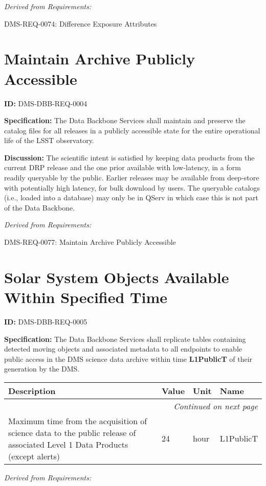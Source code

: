 \documentclass[SE,toc,lsstdraft]{lsstdoc}
\makeatletter
\newcommand{\paramname}[1]{\hspace{0pt}#1}
\newcommand{\unitname}[1]{\hspace{0pt}#1}
\newenvironment{parameters}[0]{%
\setlength\LTleft{0pt}
\setlength\LTright{\fill}
\begin{small}
\begin{longtable}[]{|p{0.49\textwidth}|l|p{0.6in}|p{1.70in}@{}|}

\hline \textbf{Description} & \textbf{Value} & \textbf{Unit} & \textbf{Name} \\ \hline
\endhead

\hline \multicolumn{4}{r}{\emph{Continued on next page}} \\
\endfoot

\hline\hline
\endlastfoot
}{%
\hline
\end{longtable}
\end{small}
}
\makeatother
\begin{document}
\emph{Derived from Requirements:}

DMS-REQ-0074:
Difference Exposure Attributes \newline

\section{Maintain Archive Publicly Accessible}

\label{DMS-DBB-REQ-0004}
\textbf{ID:} DMS-DBB-REQ-0004

\textbf{Specification:}
The Data Backbone Services shall maintain and preserve the catalog files for all releases in a publicly accessible state for the entire operational life of the LSST observatory.

\textbf{Discussion:}
The scientific intent is satisfied by keeping data products from the current DRP release and the one prior available with low-latency, in a form readily queryable by the public. Earlier releases may be available from deep-store with potentially high latency, for bulk download by users.    The queryable catalogs (i.e., loaded into a database) may only be in QServ in which case this is not part of the Data Backbone.

\emph{Derived from Requirements:}

DMS-REQ-0077:
Maintain Archive Publicly Accessible \newline

\section{Solar System Objects Available Within Specified Time}

\label{DMS-DBB-REQ-0005}
\textbf{ID:} DMS-DBB-REQ-0005

\textbf{Specification:}
The Data Backbone Services shall replicate tables containing detected moving objects and associated metadata to all endpoints to enable public access in the DMS science data archive within time \textbf{L1PublicT} of their generation by the DMS.

\begin{parameters}
Maximum time from the acquisition of science data to the public release of associated Level 1 Data Products (except alerts)
&
24
&
\unitname{%
hour
}
&
\paramname{%
L1PublicT
} \\\hline
\end{parameters}

\emph{Derived from Requirements:}
\end{document}
